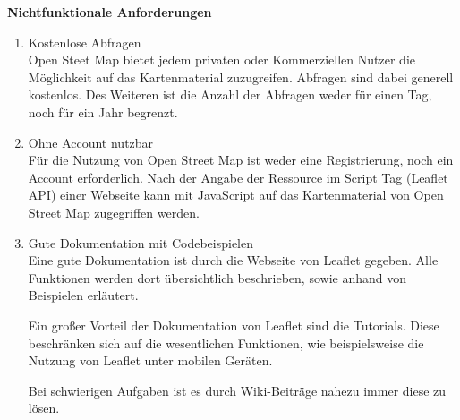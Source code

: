\textbf{Nichtfunktionale Anforderungen}
\begin{enumerate}
\item Kostenlose Abfragen \\
Open Steet Map bietet jedem privaten oder Kommerziellen Nutzer die Möglichkeit auf das Kartenmaterial zuzugreifen. Abfragen sind dabei generell kostenlos. Des Weiteren ist die Anzahl der Abfragen weder für einen Tag, noch für ein Jahr begrenzt. \cite{gruber2015}


\item Ohne Account nutzbar\\
Für die Nutzung von Open Street Map ist weder eine Registrierung, noch ein Account erforderlich. Nach der Angabe der Ressource im Script Tag (Leaflet API) einer Webseite kann mit JavaScript auf das Kartenmaterial von Open Street Map zugegriffen werden. 
\cite{leaflet}

\item Gute Dokumentation mit Codebeispielen\\
Eine gute Dokumentation ist durch die Webseite von Leaflet gegeben. Alle Funktionen werden dort übersichtlich beschrieben, sowie anhand von Beispielen erläutert. 

Ein großer Vorteil der Dokumentation von Leaflet sind die Tutorials. Diese beschränken sich auf die wesentlichen Funktionen, wie beispielsweise die Nutzung von Leaflet unter mobilen Geräten. 
\cite{leaflet}

Bei schwierigen Aufgaben ist es durch Wiki-Beiträge nahezu immer diese zu lösen. \cite{gruber2015}


\end{enumerate}

